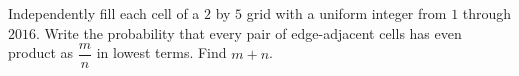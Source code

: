 Independently fill each cell of a $2$ by $5$ grid with a uniform integer from $1$ through $2016$. Write the probability that every pair of edge-adjacent cells has even product as $\dfrac{m}{n}$ in lowest terms. Find $m+n$.

